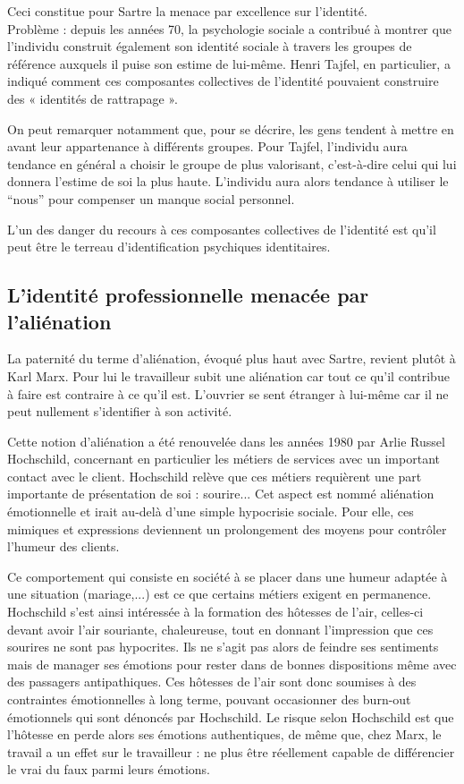 	Ceci constitue pour Sartre la menace par excellence sur l'identité.\\

	Problème : depuis les années 70, la psychologie sociale a contribué à montrer que l’individu construit également son identité sociale à travers les groupes de référence auxquels il puise son estime de lui-même.
	Henri Tajfel, en particulier, a indiqué comment ces composantes collectives de l'identité pouvaient construire des « identités de rattrapage ».

	On peut remarquer notamment que, pour se décrire, les gens tendent à mettre en avant leur appartenance à différents groupes.
	Pour Tajfel, l'individu aura tendance en général a choisir le groupe de plus valorisant, c'est-à-dire celui qui lui donnera l'estime de soi la plus haute.
	L'individu aura alors tendance à utiliser le “nous” pour compenser un manque social personnel.

	L'un des danger du recours à ces composantes collectives de l'identité est qu'il peut être le terreau d'identification psychiques identitaires.

\subsection{L'identité professionnelle menacée par l'aliénation}
	La paternité du terme d'aliénation, évoqué plus haut avec Sartre, revient plutôt à Karl Marx.
	Pour lui le travailleur subit une aliénation car tout ce qu'il contribue à faire est contraire à ce qu'il est.
	L'ouvrier se sent étranger à lui-même car il ne peut nullement s'identifier à son activité.


	Cette notion d'aliénation a été renouvelée dans les années 1980 par Arlie Russel Hochschild, concernant en particulier les métiers de services avec un important contact avec le client.
	Hochschild relève que ces métiers requièrent une part importante de présentation de soi : sourire...
	Cet aspect est nommé aliénation émotionnelle et irait au-delà d'une simple hypocrisie sociale.
	Pour elle, ces mimiques et expressions deviennent un prolongement des moyens pour contrôler l'humeur des clients.

	Ce comportement qui consiste en société à se placer dans une humeur adaptée à une situation (mariage,...) est ce que certains métiers exigent en permanence.
	Hochschild s'est ainsi intéressée à la formation des hôtesses de l'air, celles-ci devant avoir l'air souriante, chaleureuse, tout en donnant l'impression que ces sourires ne sont pas hypocrites.
	Ils ne s'agit pas alors de feindre ses sentiments mais de manager ses émotions pour rester dans de bonnes dispositions même avec des passagers antipathiques.
	Ces hôtesses de l'air sont donc soumises à des contraintes émotionnelles à long terme, pouvant occasionner des burn-out émotionnels qui sont dénoncés par Hochschild.
	Le risque selon Hochschild est que l'hôtesse en perde alors ses émotions authentiques, de même que, chez Marx, le travail a un effet sur le travailleur : ne plus être réellement capable de différencier le vrai du faux parmi leurs émotions.
